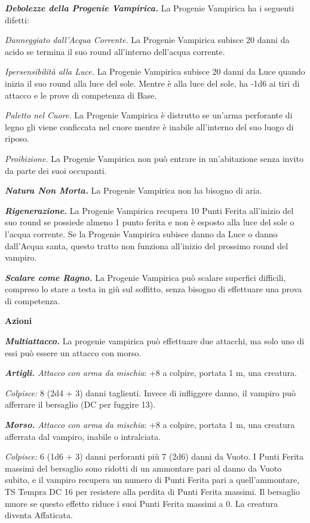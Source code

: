 \begin{multicols}{2}
{\emph{\textbf{Debolezze della Progenie Vampirica.}} La Progenie Vampirica ha i seguenti difetti:

\emph{Danneggiato dall'Acqua Corrente.} La Progenie Vampirica subisce 20 danni da acido se termina il suo round all'interno dell'acqua corrente.

\emph{Ipersensibilità alla Luce.} La Progenie Vampirica subisce 20 danni da Luce quando inizia il suo round alla luce del sole. Mentre è alla luce del sole, ha -1d6 ai tiri di attacco e le prove di competenza di Base.

\emph{Paletto nel Cuore.} La Progenie Vampirica è distrutto se un'arma perforante di legno gli viene conficcata nel cuore mentre è inabile all'interno del suo luogo di riposo.

\emph{Proibizione.} La Progenie Vampirica non può entrare in un'abitazione senza invito da parte dei suoi occupanti.

\emph{\textbf{Natura Non Morta.}} La Progenie Vampirica non ha bisogno di aria.

\emph{\textbf{Rigenerazione.}} La Progenie Vampirica recupera 10 Punti Ferita all'inizio del suo round se possiede almeno 1 punto ferita e non è esposto alla luce del sole o l'acqua corrente. Se la Progenie Vampirica subisce danno da Luce o danno dall'Acqua santa, questo tratto non funziona all'inizio del prossimo round del vampiro.

\emph{\textbf{Scalare come Ragno.}} La Progenie Vampirica può scalare superfici difficili, compreso lo stare a testa in giù sul soffitto, senza bisogno di effettuare una prova di competenza.

\textbf{Azioni}

\emph{\textbf{Multiattacco.}} La progenie vampirica può effettuare due attacchi, ma solo uno di essi può essere un attacco con morso.

\emph{\textbf{Artigli.} Attacco con arma da mischia}: +8 a colpire, portata 1 m, una creatura.

\emph{Colpisce:} 8 (2d4 + 3) danni taglienti. Invece di infliggere danno, il vampiro può afferrare il bersaglio (DC per fuggire 13).

\emph{\textbf{Morso.} Attacco con arma da mischia}: +8 a colpire, portata 1 m, una creatura afferrata dal vampiro, inabile o intralciata.

\emph{Colpisce:} 6 (1d6 + 3) danni perforanti più 7 (2d6) danni da Vuoto. I Punti Ferita massimi del bersaglio sono ridotti di un ammontare pari al danno da Vuoto subito, e il vampiro recupera un numero di Punti Ferita pari a quell'ammontare, TS Tempra DC 16 per resistere alla perdita di Punti Ferita massimi. Il bersaglio muore se questo effetto riduce i suoi Punti Ferita massimi a 0. La creatura diventa Affaticata.

}
\end{multicols}

